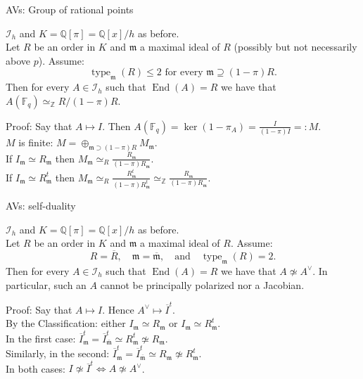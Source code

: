 \documentclass[usenames,dvipsnames,handout]{beamer}
\def\Q{\mathbb{Q}}
\def\Z{\mathbb{Z}}
\def\F{\mathbb{F}}
\DeclareMathOperator{\End}{End}
\DeclareMathOperator{\type}{type}
\renewcommand{\frm}{{\mathfrak m}}
\begin{document}
\begin{frame}{ AVs: Group of rational points }
    \begin{theorem}[ Springer-M. ]
        $\mathcal{I}_h$ and $K=\Q[\pi]=\Q[x]/h$ as before.\\
        \pause Let $R$ be an order in $K$ and $\frm$ a maximal ideal of $R$ (possibly but not necessarily above $p$). 
        \pause Assume:
        \[ \type_\frm(R) \leq 2 \text{ for every }\frm \supseteq (1-\pi)R.\]
        \pause Then for every $A \in \mathcal{I}_h$ such that $\End(A)=R$ we have that $A(\F_q) \simeq_\Z R/(1-\pi)R$.
    \end{theorem}
    \pause Proof: Say that $A \mapsto I$. Then $A(\F_q) = \ker(1-\pi_A) = \frac{I}{(1-\pi)I}=:M$.\\
    \pause $M$ is finite: $M=\oplus_{\frm \supset (1-\pi)R} M_\frm$.\\
    \pause If $I_\frm\simeq R_\frm$ then $M_\frm \simeq_R \frac{R_\frm}{(1-\pi)R_\frm}$.\\
    \pause If $I_\frm \simeq R^t_\frm$ then $M_\frm \simeq_R \frac{R^t_\frm}{(1-\pi)R^t_\frm} \simeq_\Z \frac{R_\frm}{(1-\pi)R_\frm}$.
\end{frame}

\begin{frame}{ AVs: self-duality }
    \begin{theorem}[ Springer-M. ]
        $\mathcal{I}_h$ and $K=\Q[\pi]=\Q[x]/h$ as before.\\
        \pause Let $R$ be an order in $K$ and $\frm$ a maximal ideal of $R$. 
        \pause Assume:
        \[ R=\overline{R}, \quad \frm = \overline{\frm},\quad \text{and}\quad \type_\frm(R) = 2 .\]
        \pause Then for every $A \in \mathcal{I}_h$ such that $\End(A)=R$ we have that $A\not\simeq A^\vee$. 
        \pause In particular, such an $A$ cannot be principally polarized nor a Jacobian.
    \end{theorem}
    \pause Proof: Say that $A \mapsto I$. Hence $A^\vee \mapsto \overline{I}^t$.\\
    \pause By the Classification: either $I_\frm\simeq R_\frm$ or $I_\frm\simeq R_\frm^t$.\\
    \pause In the first case: $\overline{I}_\frm^t = \overline{I}_{\overline{\frm}}^t \simeq R^t_\frm \not\simeq R_\frm$.\\
    \pause Similarly, in the second: $\overline{I}_\frm^t = \overline{I}_{\overline{\frm}}^t \simeq R_\frm \not\simeq R_\frm^t$.\\
    \pause In both cases: $I\not\simeq \overline{I}^t \iff A\not \simeq A^\vee$.
\end{frame}
\end{document}
